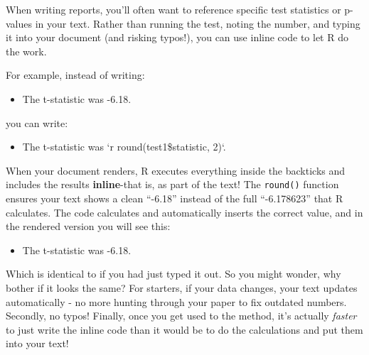 \documentclass[
  letterpaper,
]{book}
\providecommand{\tightlist}{%
  \setlength{\itemsep}{0pt}\setlength{\parskip}{0pt}}\usepackage{longtable,booktabs,array}
\begin{document}
\begin{tcolorbox}[enhanced jigsaw, colframe=quarto-callout-tip-color-frame, breakable, arc=.35mm, bottomtitle=1mm, bottomrule=.15mm, colbacktitle=quarto-callout-tip-color!10!white, rightrule=.15mm, colback=white, opacityback=0, opacitybacktitle=0.6, coltitle=black, left=2mm, toptitle=1mm, toprule=.15mm, titlerule=0mm, leftrule=.75mm, title=\textcolor{quarto-callout-tip-color}{\faLightbulb}\hspace{0.5em}{May the Format Be With You: Let R Write Your Paper}]

When writing reports, you'll often want to reference specific test
statistics or p-values in your text. Rather than running the test,
noting the number, and typing it into your document (and risking
typos!), you can use inline code to let R do the work.

For example, instead of writing:

\begin{itemize}
\tightlist
\item
  The t-statistic was -6.18.
\end{itemize}

you can write:

\begin{itemize}
\tightlist
\item
  The t-statistic was `r round(test1\$statistic, 2)`.
\end{itemize}

When your document renders, R executes everything inside the backticks
and includes the results \textbf{inline}-that is, as part of the text!
The \texttt{round()} function ensures your text shows a clean ``-6.18''
instead of the full ``-6.178623'' that R calculates. The code calculates
and automatically inserts the correct value, and in the rendered version
you will see this:

\begin{itemize}
\tightlist
\item
  The t-statistic was -6.18.
\end{itemize}

Which is identical to if you had just typed it out. So you might wonder,
why bother if it looks the same? For starters, if your data changes,
your text updates automatically - no more hunting through your paper to
fix outdated numbers. Secondly, no typos! Finally, once you get used to
the method, it's actually \emph{faster} to just write the inline code
than it would be to do the calculations and put them into your text!

\end{tcolorbox}
\end{document}
